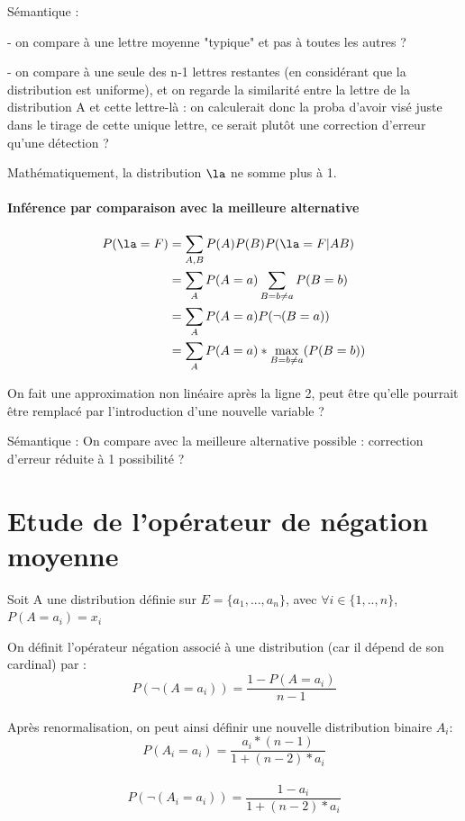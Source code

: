 \documentclass{article}
\begin{document}
 Sémantique : 
 
 - on compare à une lettre moyenne "typique" et pas à toutes les autres ? 
 
 - on compare à une seule des n-1 lettres restantes (en considérant que la distribution est uniforme), et on regarde la similarité entre la lettre de la distribution A et cette lettre-là : on calculerait donc la proba d'avoir visé juste dans le tirage de cette unique lettre, ce serait plutôt une correction d'erreur qu'une détection ?  
 
 Mathématiquement, la distribution $\la$ ne somme plus à 1.
 
 \paragraph{Inférence par comparaison avec la meilleure alternative}
 

 \begin{align*}
P(\la =F) &=  \sum_{A,B}P(A)P(B)P(\la =F|AB) \\
 &= \sum_{A} P(A=a) \sum_{B=b\neq a} P(B=b)\\
 &=  \sum_{A}P(A=a) P(\neg (B=a)) \\
 &= \sum_{A} P(A=a) * \max_{B=b\neq a} (P(B=b))\\
 \end{align*}
 
On fait une approximation non linéaire après la ligne 2, peut être qu'elle pourrait être remplacé par l'introduction d'une nouvelle variable ? 
  
Sémantique : On compare avec la meilleure alternative possible : correction d'erreur réduite à 1 possibilité ?
  

  
  \section{Etude de l'opérateur de négation moyenne}

  Soit A une distribution définie sur $E=\{ a_1,...,a_n \}$, avec $\forall i \in \{ 1,..,n \}$, $P(A=a_i)=x_i$
  
  On définit l'opérateur négation associé à une distribution (car il dépend de son cardinal) par :\\
  $$P(\neg (A=a_i))=\frac{1-P(A=a_i)}{n-1}$$\\
  
  Après renormalisation, on peut ainsi définir une nouvelle distribution binaire $A_i$:\\
  $$P(A_i=a_i)=\frac{a_i*(n-1)}{1+(n-2)*a_i}$$\\
  $$P(\neg (A_i=a_i))=\frac{1-a_i}{1+(n-2)*a_i}$$ \\
  
\end{document}
